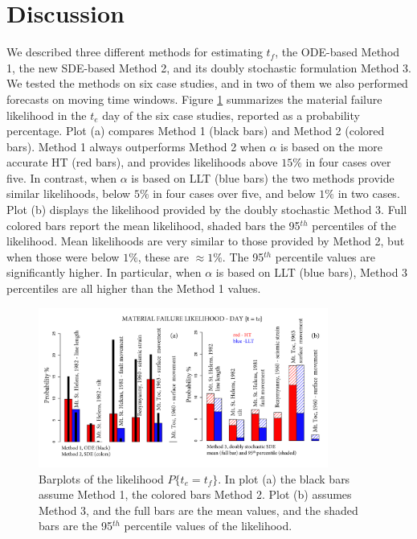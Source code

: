 \documentclass{article}
\begin{document}
\section{Discussion}
We described three different methods for estimating $t_f$, the ODE-based Method 1, the new SDE-based Method 2, and its doubly stochastic formulation Method 3. We tested the methods on six case studies, and in two of them we also performed forecasts on moving time windows. Figure \ref{Fig15} summarizes the material failure likelihood in the $t_e$ day of the six case studies, reported as a probability percentage. Plot (a) compares Method 1 (black bars) and Method 2 (colored bars). Method 1 always outperforms Method 2 when $\alpha$ is based on the more accurate HT (red bars), and provides likelihoods above $15\%$ in four cases over five. In contrast, when $\alpha$ is based on LLT (blue bars) the two methods provide similar likelihoods, below $5\%$ in four cases over five, and below $1\%$ in two cases. Plot (b) displays the likelihood provided by the doubly stochastic Method 3. Full colored bars report the mean likelihood, shaded bars the 95$^{th}$ percentiles of the likelihood. Mean likelihoods are very similar to those provided by Method 2, but when those were below $1\%$, these are $\approx 1\%$. The 95$^{th}$ percentile values are significantly higher. In particular, when $\alpha$ is based on LLT (blue bars), Method 3 percentiles are all higher than the Method 1 values.

\begin{figure}[H]
\centering
\includegraphics[width=0.85\textwidth]{Fig15_plus.png}
\caption{Barplots of the likelihood $P\{t_e=t_f\}$. In plot (a) the black bars assume Method 1, the colored bars Method 2. Plot (b) assumes Method 3, and the full bars are the mean values, and the shaded bars are the 95$^{th}$ percentile values of the likelihood.}
\label{Fig15}
\end{figure}
\end{document}
